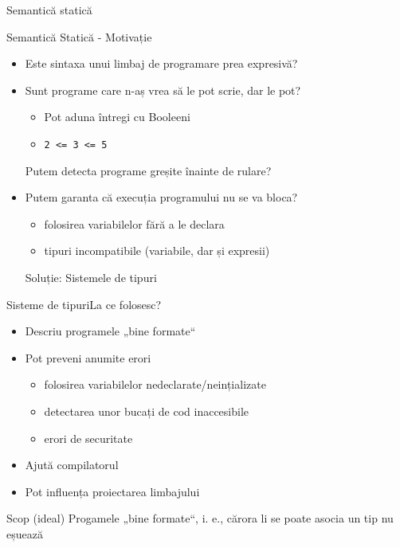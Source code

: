 \documentclass[xcolor=pdftex,romanian,colorlinks]{beamer}
\begin{document}
\begin{section}{Semantică statică}
  \begin{frame}{Semantică Statică - Motivație}
    \begin{itemize}
      \item Este sintaxa unui limbaj de programare prea expresivă?
      \item Sunt programe care n-aș vrea să le pot scrie, dar le pot?
      \begin{itemize}
        \item<2-> Pot aduna întregi cu Booleeni
        \item<2-> \lstinline{2 <= 3 <= 5}
      \end{itemize}
    \vitem Putem detecta programe greșite înainte de rulare?
    \item Putem garanta că execuția programului nu se va bloca?

    \begin{itemize}
      \item<2-> folosirea variabilelor fără a le declara
      \item<2-> tipuri incompatibile (variabile, dar și expresii)
    \end{itemize}
     Soluție: Sistemele de tipuri
    \end{itemize}
    \end{frame}

    \begin{frame}{Sisteme de tipuri}{La ce folosesc?}

    \begin{itemize}
    \item Descriu programele „bine formate“
    \item Pot preveni anumite erori
    \begin{itemize}
    \item folosirea variabilelor nedeclarate/neințializate
    \item detectarea unor bucați de cod inaccesibile
    \item erori de securitate
    \end{itemize}
    \item Ajută compilatorul
    \item Pot influența proiectarea limbajului
    \end{itemize}
    \vfill
    \begin{block}{Scop (ideal)}
    Progamele „bine formate“, i. e., cărora li se poate asocia un tip nu eșuează
    \end{block}
    \end{frame}


\end{section}
\end{document}
